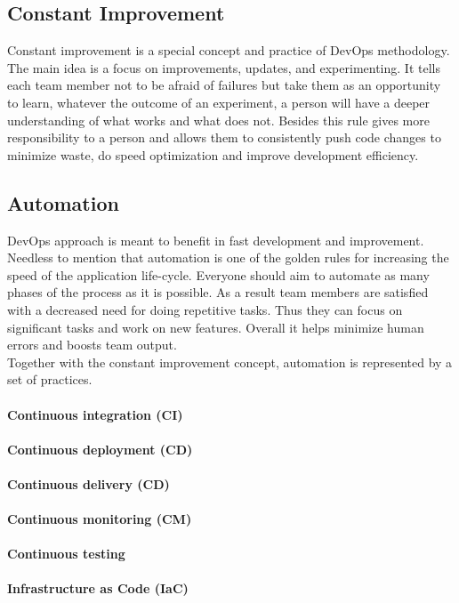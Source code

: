\subsection{Constant Improvement} Constant improvement is a special concept and practice of DevOps methodology. The main idea is a focus on improvements, updates, and experimenting. It tells each team member not to be afraid of failures but take them as an opportunity to learn, whatever the outcome of an experiment, a person will have a deeper understanding of what works and what does not. Besides this rule gives more responsibility to a person and allows them to consistently push code changes to minimize waste, do speed optimization and improve development efficiency.

\subsection{Automation} DevOps approach is meant to benefit in fast development and improvement. Needless to mention that automation is one of the golden rules for increasing the speed of the application life-cycle. Everyone should aim to automate as many phases of the process as it is possible. As a result team members are satisfied with a decreased need for doing repetitive tasks. Thus they can focus on significant tasks and work on new features. Overall it helps minimize human errors and boosts team output. \\

\noindent Together with the constant improvement concept, automation is represented by a set of practices.



\paragraph*{Continuous integration (CI)}

\paragraph*{Continuous deployment (CD)}

\paragraph*{Continuous delivery (CD)}

\paragraph*{Continuous monitoring (CM)}

\paragraph*{Continuous testing}

\paragraph*{Infrastructure as Code (IaC)}









